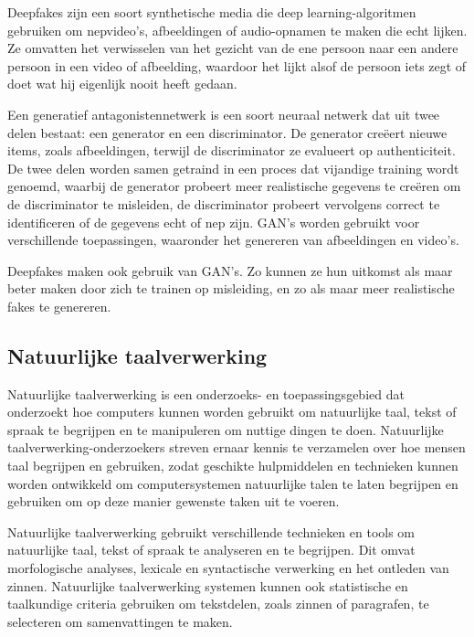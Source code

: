 Deepfakes zijn een soort synthetische media die deep learning-algoritmen gebruiken om nepvideo's, afbeeldingen of audio-opnamen te maken die echt lijken. Ze omvatten het verwisselen van het gezicht van de ene persoon naar een andere persoon in een video of afbeelding, waardoor het lijkt alsof de persoon iets zegt of doet wat hij eigenlijk nooit heeft gedaan.

\cite{mahmud2021deep}

Een generatief antagonistennetwerk is een soort neuraal netwerk dat uit twee delen bestaat: een generator en een discriminator. De generator creëert nieuwe items, zoals afbeeldingen, terwijl de discriminator ze evalueert op authenticiteit. De twee delen worden samen getraind in een proces dat vijandige training wordt genoemd, waarbij de generator probeert meer realistische gegevens te creëren om de discriminator te misleiden, de discriminator probeert vervolgens correct te identificeren of de gegevens echt of nep zijn. GAN's worden gebruikt voor verschillende toepassingen, waaronder het genereren van afbeeldingen en video's.

\cite{laino2022generative}

Deepfakes maken ook gebruik van GAN's. Zo kunnen ze hun uitkomst als maar beter maken door zich te trainen op misleiding, en zo als maar meer realistische fakes te genereren.

\subsection{Natuurlijke taalverwerking}

Natuurlijke taalverwerking is een onderzoeks- en toepassingsgebied dat onderzoekt hoe computers kunnen worden gebruikt om natuurlijke taal, tekst of spraak te begrijpen en te manipuleren om nuttige dingen te doen. Natuurlijke taalverwerking-onderzoekers streven ernaar kennis te verzamelen over hoe mensen taal begrijpen en gebruiken, zodat geschikte hulpmiddelen en technieken kunnen worden ontwikkeld om computersystemen natuurlijke talen te laten begrijpen en gebruiken om op deze manier gewenste taken uit te voeren.

Natuurlijke taalverwerking gebruikt verschillende technieken en tools om natuurlijke taal, tekst of spraak te analyseren en te begrijpen. Dit omvat morfologische analyses, lexicale en syntactische verwerking en het ontleden van zinnen. Natuurlijke taalverwerking systemen kunnen ook statistische en taalkundige criteria gebruiken om tekstdelen, zoals zinnen of paragrafen, te selecteren om samenvattingen te maken. 

